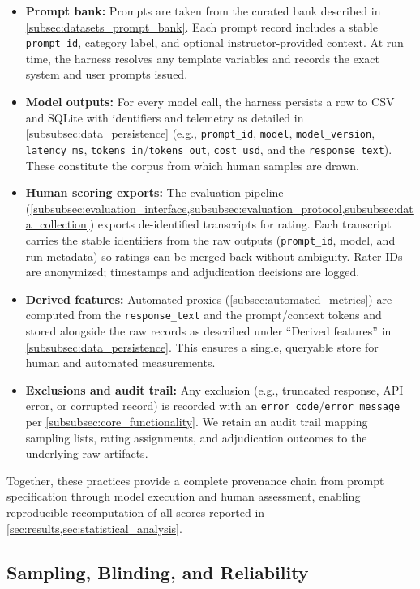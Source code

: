 \begin{itemize}
	\item \textbf{Prompt bank:} Prompts are taken from the curated bank described in \cref{subsec:datasets_prompt_bank}. Each prompt record includes a stable \verb|prompt_id|, category label, and optional instructor-provided context. At run time, the harness resolves any template variables and records the exact system and user prompts issued.
	\item \textbf{Model outputs:} For every model call, the harness persists a row to CSV and SQLite with identifiers and telemetry as detailed in \cref{subsubsec:data_persistence} (e.g., \verb|prompt_id|, \verb|model|, \verb|model_version|, \verb|latency_ms|, \verb|tokens_in|/\verb|tokens_out|, \verb|cost_usd|, and the \verb|response_text|). These constitute the corpus from which human samples are drawn.
	\item \textbf{Human scoring exports:} The evaluation pipeline (\cref{subsubsec:evaluation_interface,subsubsec:evaluation_protocol,subsubsec:data_collection}) exports de-identified transcripts for rating. Each transcript carries the stable identifiers from the raw outputs (\verb|prompt_id|, model, and run metadata) so ratings can be merged back without ambiguity. Rater IDs are anonymized; timestamps and adjudication decisions are logged.
	\item \textbf{Derived features:} Automated proxies (\cref{subsec:automated_metrics}) are computed from the \verb|response_text| and the prompt/context tokens and stored alongside the raw records as described under ``Derived features'' in \cref{subsubsec:data_persistence}. This ensures a single, queryable store for human and automated measurements.
	\item \textbf{Exclusions and audit trail:} Any exclusion (e.g., truncated response, API error, or corrupted record) is recorded with an \verb|error_code|/\verb|error_message| per \cref{subsubsec:core_functionality}. We retain an audit trail mapping sampling lists, rating assignments, and adjudication outcomes to the underlying raw artifacts.
\end{itemize}

Together, these practices provide a complete provenance chain from prompt specification through model execution and human assessment, enabling reproducible recomputation of all scores reported in \cref{sec:results,sec:statistical_analysis}.

\subsection{Sampling, Blinding, and Reliability}\label{subsec:sampling_blinding}

